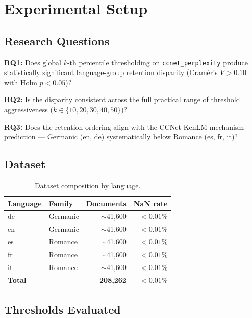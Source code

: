 \section{Experimental Setup}
\label{sec:setup}

\subsection{Research Questions}

\textbf{RQ1:} Does global $k$-th percentile thresholding on \texttt{ccnet\_perplexity} produce statistically significant language-group retention disparity (Cram{\'e}r's $V > 0.10$ with Holm $p < 0.05$)?

\textbf{RQ2:} Is the disparity consistent across the full practical range of threshold aggressiveness ($k \in \{10, 20, 30, 40, 50\}$)?

\textbf{RQ3:} Does the retention ordering align with the CCNet KenLM mechanism prediction --- Germanic (en, de) systematically below Romance (es, fr, it)?

\subsection{Dataset}

\begin{table}[h]
\centering
\caption{Dataset composition by language.}
\label{tab:dataset}
\begin{tabular}{llrr}
\toprule
Language & Family & Documents & NaN rate \\
\midrule
de & Germanic & $\sim$41,600 & $< 0.01\%$ \\
en & Germanic & $\sim$41,600 & $< 0.01\%$ \\
es & Romance  & $\sim$41,600 & $< 0.01\%$ \\
fr & Romance  & $\sim$41,600 & $< 0.01\%$ \\
it & Romance  & $\sim$41,600 & $< 0.01\%$ \\
\midrule
\textbf{Total} & & \textbf{208,262} & $< 0.01\%$ \\
\bottomrule
\end{tabular}
\end{table}

\subsection{Thresholds Evaluated}

